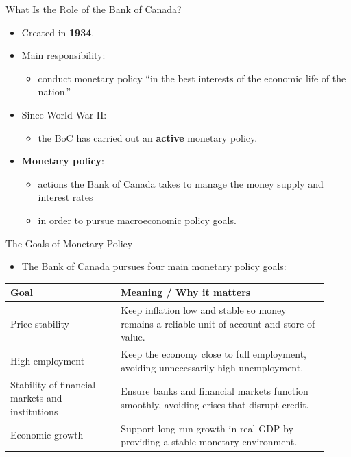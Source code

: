 \documentclass[aspectratio=169]{beamer}
\begin{document}
\begin{frame}{What Is the Role of the Bank of Canada?}
\transfade
\begin{itemize}
  \item Created in \textbf{1934}.
  \item Main responsibility:
  \begin{itemize}
    \item conduct monetary policy “in the best interests of the economic life of the nation.”
  \end{itemize}
  \item Since World War II:
  \begin{itemize}
    \item the BoC has carried out an \textbf{active} monetary policy.
  \end{itemize}
  \item \textbf{Monetary policy}:
  \begin{itemize}
    \item actions the Bank of Canada takes to manage the \alert{money supply} and \alert{interest rates}
    \item in order to pursue \alert{macroeconomic policy goals}.
  \end{itemize}
\end{itemize}
\end{frame}

\begin{frame}{The Goals of Monetary Policy}
\transfade
\begin{itemize}
  \item The Bank of Canada pursues four main monetary policy goals:
\end{itemize}
\begin{table}[h]
\centering
\begin{tabular}{p{0.32\linewidth} p{0.6\linewidth}}
\toprule
\textbf{Goal} & \textbf{Meaning / Why it matters} \\
\midrule
Price stability & Keep inflation low and stable so money remains a reliable unit of account and store of value. \\
High employment & Keep the economy close to full employment, avoiding unnecessarily high unemployment. \\
Stability of financial markets and institutions & Ensure banks and financial markets function smoothly, avoiding crises that disrupt credit. \\
Economic growth & Support long-run growth in real GDP by providing a stable monetary environment. \\
\bottomrule
\end{tabular}
\end{table}
\end{frame}
\end{document}
